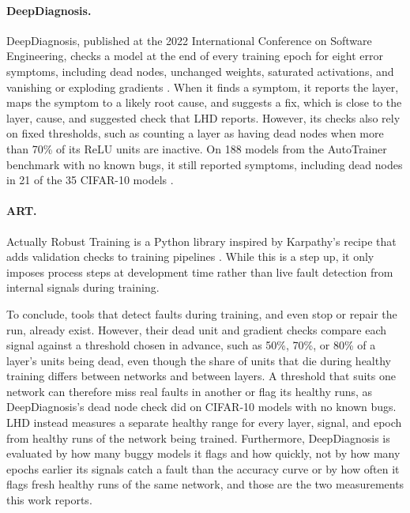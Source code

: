 \paragraph{DeepDiagnosis.} DeepDiagnosis, published at the 2022 International Conference on Software Engineering, checks a model at the end of every training epoch for eight error symptoms, including dead nodes, unchanged weights, saturated activations, and vanishing or exploding gradients \citep{wardat2022}. When it finds a symptom, it reports the layer, maps the symptom to a likely root cause, and suggests a fix, which is close to the layer, cause, and suggested check that LHD reports. However, its checks also rely on fixed thresholds, such as counting a layer as having dead nodes when more than 70\% of its ReLU units are inactive. On 188 models from the AutoTrainer benchmark with no known bugs, it still reported symptoms, including dead nodes in 21 of the 35 CIFAR-10 models \citep{wardat2022}.

\paragraph{ART.} Actually Robust Training is a Python library inspired by Karpathy's recipe that adds validation checks to training pipelines \citep{chwilczynski2024}. While this is a step up, it only imposes process steps at development time rather than live fault detection from internal signals during training.

\medskip

To conclude, tools that detect faults during training, and even stop or repair the run, already exist. However, their dead unit and gradient checks compare each signal against a threshold chosen in advance, such as 50\%, 70\%, or 80\% of a layer's units being dead, even though the share of units that die during healthy training differs between networks and between layers. A threshold that suits one network can therefore miss real faults in another or flag its healthy runs, as DeepDiagnosis's dead node check did on CIFAR-10 models with no known bugs. LHD instead measures a separate healthy range for every layer, signal, and epoch from healthy runs of the network being trained. Furthermore, DeepDiagnosis is evaluated by how many buggy models it flags and how quickly, not by how many epochs earlier its signals catch a fault than the accuracy curve or by how often it flags fresh healthy runs of the same network, and those are the two measurements this work reports.

